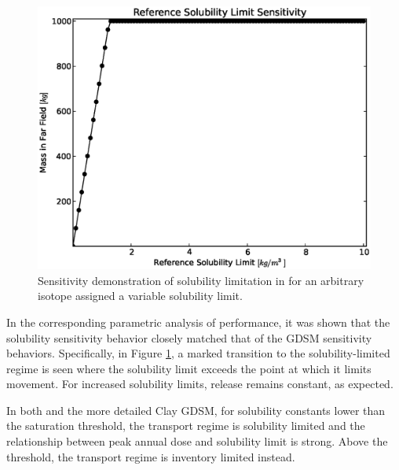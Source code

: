 \begin{figure}[ht]
\begin{center}
\includegraphics[width=0.7\linewidth]{./results/images/sol.eps}
\caption[Solubility Sensitivity in the Mixed Cell Model]{Sensitivity demonstration of solubility limitation in \Cyder for an arbitrary isotope assigned a variable solubility limit.}
\label{fig:sol_result}
\end{center}
\end{figure}


In the corresponding parametric analysis of \Cyder performance, it was shown that the
solubility sensitivity behavior closely matched that of the \gls{GDSM}
sensitivity behaviors. Specifically, in Figure \ref{fig:sol_result}, a marked 
transition to the solubility-limited regime
is seen where the solubility limit exceeds the point at which it limits
movement. For increased solubility limits, release remains constant, as
expected.

In both \Cyder and the more detailed Clay \gls{GDSM}, for solubility constants
lower than the saturation threshold, the transport regime is solubility
limited and the relationship between peak annual dose and solubility limit is
strong.  Above the threshold, the transport regime is inventory limited
instead.


